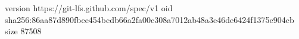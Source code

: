 version https://git-lfs.github.com/spec/v1
oid sha256:86aa87d890fbee454bcdb66a2fa00c308a7012ab48a3e46de6424f1375e904cb
size 87508
